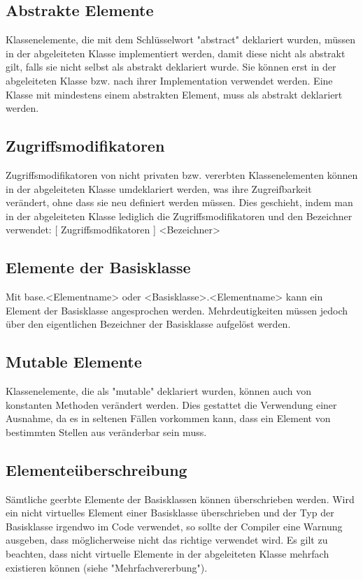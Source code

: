 \subsection{Abstrakte Elemente}
Klassenelemente, die mit dem Schlüsselwort "abstract" deklariert wurden, müssen in der abgeleiteten Klasse implementiert werden,
damit diese nicht als abstrakt gilt, falls sie nicht selbst als abstrakt deklariert wurde.
Sie können erst in der abgeleiteten Klasse bzw. nach ihrer Implementation verwendet werden.
Eine Klasse mit mindestens einem abstrakten Element, muss als abstrakt deklariert werden.

\subsection{Zugriffsmodifikatoren}
Zugriffsmodifikatoren von nicht privaten bzw. vererbten Klassenelementen können in der abgeleiteten Klasse umdeklariert werden,
was ihre Zugreifbarkeit verändert, ohne dass sie neu definiert werden müssen.
Dies geschieht, indem man in der abgeleiteten Klasse lediglich die Zugriffsmodifikatoren und den Bezeichner verwendet:
[ Zugriffsmodfikatoren ] <Bezeichner>

\subsection{Elemente der Basisklasse}
Mit base.<Elementname> oder <Basisklasse>.<Elementname> kann ein Element der Basisklasse angesprochen werden.
Mehrdeutigkeiten müssen jedoch über den eigentlichen Bezeichner der Basisklasse aufgelöst werden.

\subsection{Mutable Elemente}
Klassenelemente, die als "mutable" deklariert wurden, können auch von konstanten Methoden verändert werden. Dies gestattet die
Verwendung einer Ausnahme, da es in seltenen Fällen vorkommen kann, dass ein Element von bestimmten Stellen aus veränderbar sein
muss.

\subsection{Elementeüberschreibung}
Sämtliche geerbte Elemente der Basisklassen können überschrieben werden.
Wird ein nicht virtuelles Element einer Basisklasse überschrieben und der Typ der Basisklasse irgendwo im Code verwendet, so sollte
der Compiler eine Warnung ausgeben, dass möglicherweise nicht das richtige verwendet wird.
Es gilt zu beachten, dass nicht virtuelle Elemente in der abgeleiteten Klasse mehrfach existieren können (siehe "Mehrfachvererbung").

